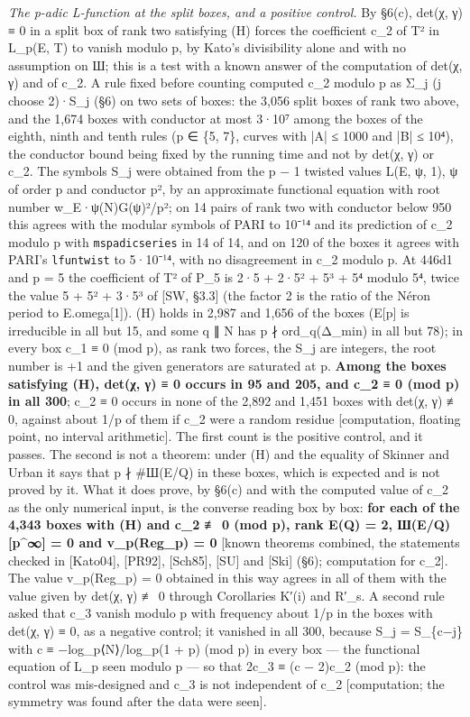 \documentclass[11pt,a4paper]{article}
\theoremstyle{named}
\begin{document}
\textit{The p-adic L-function at the split boxes, and a positive control.} By §6(c), det(χ, γ) ≡ 0 in a split box of rank two satisfying (H) forces the coefficient c\_2 of T² in L\_p(E, T) to vanish modulo p, by Kato's divisibility alone and with no assumption on Ш; this is a test with a known answer of the computation of det(χ, γ) and of c\_2. A rule fixed before counting computed c\_2 modulo p as Σ\_j (j choose 2)·S\_j (§6) on two sets of boxes: the 3,056 split boxes of rank two above, and the 1,674 boxes with conductor at most 3·10⁷ among the boxes of the eighth, ninth and tenth rules (p ∈ \{5, 7\}, curves with |A| ≤ 1000 and |B| ≤ 10⁴), the conductor bound being fixed by the running time and not by det(χ, γ) or c\_2. The symbols S\_j were obtained from the p − 1 twisted values L(E, ψ, 1), ψ of order p and conductor p², by an approximate functional equation with root number w\_E·ψ(N)G(ψ)²/p²; on 14 pairs of rank two with conductor below 950 this agrees with the modular symbols of PARI to 10⁻¹⁴ and its prediction of c\_2 modulo p with \texttt{mspadicseries} in 14 of 14, and on 120 of the boxes it agrees with PARI's \texttt{lfuntwist} to 5·10⁻¹⁴, with no disagreement in c\_2 modulo p. At 446d1 and p = 5 the coefficient of T² of P\_5 is 2·5 + 2·5² + 5³ + 5⁴ modulo 5⁴, twice the value 5 + 5² + 3·5³ of [SW, §3.3] (the factor 2 is the ratio of the Néron period to E.omega[1]). (H) holds in 2,987 and 1,656 of the boxes (E[p] is irreducible in all but 15, and some q ∥ N has p ∤ ord\_q(Δ\_min) in all but 78); in every box c\_1 ≡ 0 (mod p), as rank two forces, the S\_j are integers, the root number is +1 and the given generators are saturated at p. \textbf{Among the boxes satisfying (H), det(χ, γ) ≡ 0 occurs in 95 and 205, and c\_2 ≡ 0 (mod p) in all 300}; c\_2 ≡ 0 occurs in none of the 2,892 and 1,451 boxes with det(χ, γ) ≢ 0, against about 1/p of them if c\_2 were a random residue [computation, floating point, no interval arithmetic]. The first count is the positive control, and it passes. The second is not a theorem: under (H) and the equality of Skinner and Urban it says that p ∤ \#Ш(E/Q) in these boxes, which is expected and is not proved by it. What it does prove, by §6(c) and with the computed value of c\_2 as the only numerical input, is the converse reading box by box: \textbf{for each of the 4,343 boxes with (H) and c\_2 ≢ 0 (mod p), rank E(Q) = 2, Ш(E/Q)[p\textasciicircum{}∞] = 0 and v\_p(Reg\_p) = 0} [known theorems combined, the statements checked in [Kato04], [PR92], [Sch85], [SU] and [Ski] (§6); computation for c\_2]. The value v\_p(Reg\_p) = 0 obtained in this way agrees in all of them with the value given by det(χ, γ) ≢ 0 through Corollaries K′(i) and R′\_s. A second rule asked that c\_3 vanish modulo p with frequency about 1/p in the boxes with det(χ, γ) ≡ 0, as a negative control; it vanished in all 300, because S\_j = S\_\{c−j\} with c ≡ −log\_p⟨N⟩/log\_p(1 + p) (mod p) in every box — the functional equation of L\_p seen modulo p — so that 2c\_3 ≡ (c − 2)c\_2 (mod p): the control was mis-designed and c\_3 is not independent of c\_2 [computation; the symmetry was found after the data were seen].
\end{document}
